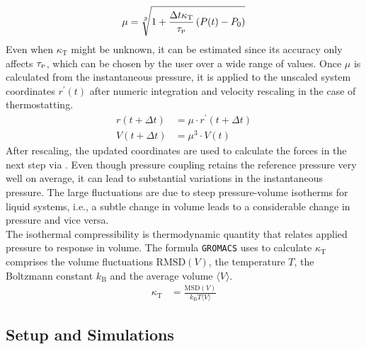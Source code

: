 \documentclass[9pt,tutorial]{livecoms}
\begin{document}
\begin{align}
    \mu = \sqrt[3]{1 + \frac{\Delta t \kappa_\text{T}}{\tau_\text{\tiny P}} \left(P(t) - P_0\right)}
\end{align}
Even when $\kappa_\text{T}$ might be unknown, it can be estimated since its accuracy only affects $\tau_\text{\tiny P}$, which can be chosen by the user over a wide range of values. Once $\mu$ is calculated from the instantaneous pressure, it is applied to the unscaled system coordinates $r^\prime(t)$ after numeric integration and velocity rescaling in the case of thermostatting.\cite{Berendsen1984}
\begin{align}
    r(t+\Delta t) &= \mu \cdot r^\prime(t+\Delta t) \\
    V(t+\Delta t) &= \mu^3 \cdot V(t)
\end{align}
After rescaling, the updated coordinates are used to calculate the forces in the next step via . Even though pressure coupling retains the reference pressure very well on average, it can lead to substantial variations in the instantaneous pressure. The large fluctuations are due to steep pressure-volume isotherms for liquid systems, i.e., a subtle change in volume leads to a considerable change in pressure and vice versa.\cite{Landau1980}\\
The isothermal compressibility is thermodynamic quantity that relates applied pressure to response in volume. The formula \texttt{GROMACS} uses to calculate $\kappa_\text{T}$ comprises the volume fluctuations $\text{RMSD}(V)$, the temperature $T$, the Boltzmann constant $k_\text{B}$ and the average volume $\langle V \rangle$.\cite{Allen1990}
\begin{align}\label{eq:isothermalcomp}
    \kappa_\text{T} & = \frac{\text{MSD}(V)}{k_\text{B} T \langle V \rangle}
\end{align}


\subsection*{Setup and Simulations}
\end{document}
